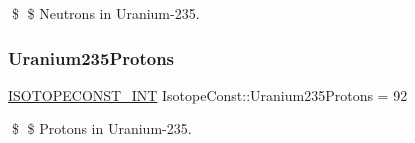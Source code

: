 \$ \$ Neutrons in Uranium-\/235. \mbox{\label{group___isotope_const-_uranium-_u235_ga83e44b6128bc45b8579bec557de6d7be}} 
\subsubsection{\texorpdfstring{Uranium235\+Protons}{Uranium235Protons}}
{\footnotesize\ttfamily \mbox{\hyperlink{group___isotope_const-_macros_ga5f18360b3e99483a35c32d789e62621c}{I\+S\+O\+T\+O\+P\+E\+C\+O\+N\+S\+T\+\_\+\+I\+NT}} Isotope\+Const\+::\+Uranium235\+Protons = 92}

\$ \$ Protons in Uranium-\/235. 